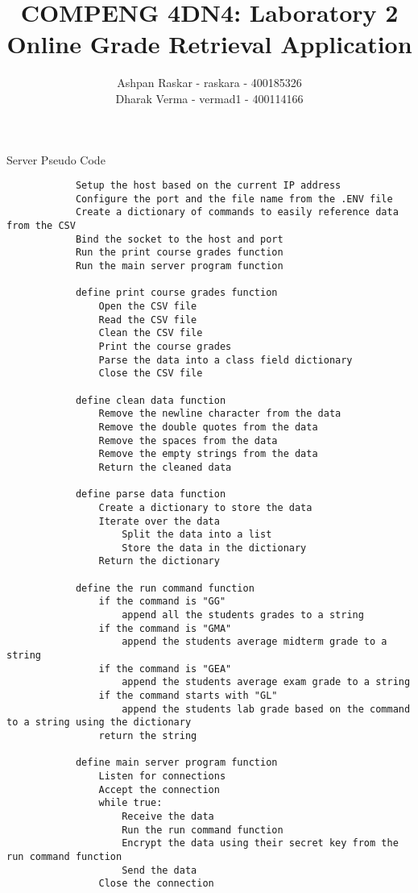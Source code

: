 \documentclass[titlepage]{article}
\title{COMPENG 4DN4: Laboratory 2\\Online Grade Retrieval Application}
\author{Ashpan Raskar - raskara - 400185326\\Dharak Verma - vermad1 - 400114166}
\date{}
\begin{document}
    \maketitle
    \newpage

    \begin{section}{Server Pseudo Code}
        \begin{verbatim}
            Setup the host based on the current IP address
            Configure the port and the file name from the .ENV file
            Create a dictionary of commands to easily reference data from the CSV
            Bind the socket to the host and port
            Run the print course grades function
            Run the main server program function

            define print course grades function
                Open the CSV file
                Read the CSV file
                Clean the CSV file
                Print the course grades
                Parse the data into a class field dictionary
                Close the CSV file

            define clean data function
                Remove the newline character from the data
                Remove the double quotes from the data
                Remove the spaces from the data
                Remove the empty strings from the data
                Return the cleaned data

            define parse data function
                Create a dictionary to store the data
                Iterate over the data
                    Split the data into a list
                    Store the data in the dictionary
                Return the dictionary

            define the run command function
                if the command is "GG"
                    append all the students grades to a string
                if the command is "GMA"
                    append the students average midterm grade to a string
                if the command is "GEA"
                    append the students average exam grade to a string
                if the command starts with "GL"
                    append the students lab grade based on the command to a string using the dictionary
                return the string

            define main server program function
                Listen for connections
                Accept the connection
                while true:
                    Receive the data
                    Run the run command function
                    Encrypt the data using their secret key from the run command function
                    Send the data
                Close the connection
        \end{verbatim}
    \end{section}
\end{document}
